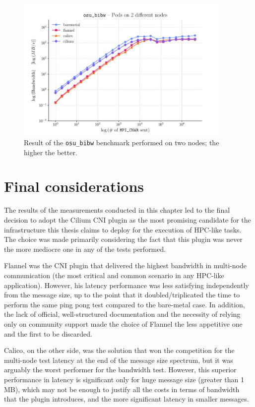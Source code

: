 \begin{figure}[H]
  \centering
  \includegraphics[width=0.94\textwidth]{img/chpt3/bibw-2-nodes}
  \caption{Result of the \texttt{osu\_bibw} benchmark performed on two nodes; the
    higher the better.}
  \label{fig:bibw-2-nodes}
\end{figure}

\section{Final considerations}\label{sec:final-considerations}

The results of the measurements conducted in this chapter led to the final
decision to adopt the Cilium CNI plugin as the most promising candidate for the
infrastructure this thesis claims to deploy for the execution of HPC-like tasks.
The choice was made primarily considering the fact that this plugin was never
the more mediocre one in any of the tests performed.

Flannel was the CNI plugin that delivered the highest bandwidth in multi-node
communication (the most critical and common scenario in any HPC-like
application). However, his latency performance was less satisfying independently
from the message size, up to the point that it doubled/triplicated the time to
perform the same ping pong test compared to the bare-metal case.
In addition, the lack of official, well-structured documentation and the
necessity of relying only on community support made the choice of Flannel the
less appetitive one and the first to be discarded.

Calico, on the other side, was the solution that won the competition for the
multi-node test latency at the end of the message size spectrum, but it was
arguably the worst performer for the bandwidth test.
However, this superior performance in latency is significant only for huge
message size (greater than 1 MB), which may not be enough to justify all the
costs in terms of bandwidth that the plugin introduces, and the more significant
latency in smaller messages.

